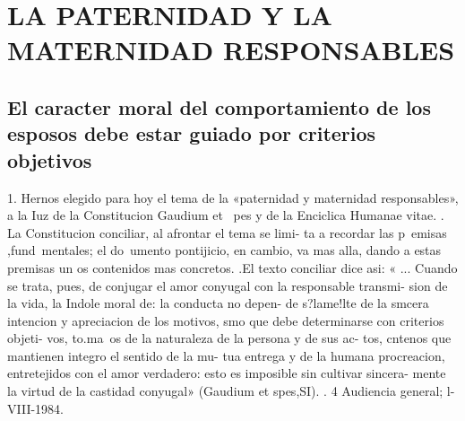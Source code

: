 \documentclass[letterpaper]{report}
\begin{document}
	{\centering
		\section{LA PATERNIDAD Y LA MATERNIDAD RESPONSABLES}
	}
		\subsection{El caracter moral del comportamiento de los esposos 
		debe estar guiado por criterios objetivos}
			1. Hernos elegido para hoy el tema de la «paternidad 
			y maternidad responsables», a la Iuz de la Constitucion 
			Gaudium et ~pes y de la Enciclica Humanae vitae. . 
			La Constitucion conciliar, al afrontar el tema se limi- 
			ta a recordar las p~emisas ,fund~mentales; el do~umento 
			pontijicio, en cambio, va mas alla, dando a estas premisas 
			un os contenidos mas concretos. 
			.El texto conciliar dice asi: « ... Cuando se trata, pues, de 
			conjugar el amor conyugal con la responsable transmi- 
			sion de la vida, la Indole moral de: la conducta no depen- 
			de s?lame!lte de la smcera intencion y apreciacion de los 
			motivos, smo que debe determinarse con criterios objeti- 
			vos, to.ma~os de la naturaleza de la persona y de sus ac- 
			tos, cntenos que mantienen integro el sentido de la mu- 
			tua entrega y de la humana procreacion, entretejidos con 
			el amor verdadero: esto es imposible sin cultivar sincera- 
			mente la virtud de la castidad conyugal» (Gaudium et 
				spes,SI). 	. 
			4 Audiencia general; l-VIII-1984. 
		
\end{document}
